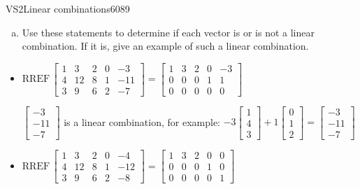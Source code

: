 \begin{exercise}{VS2}{Linear combinations}{6089}
\begin{exerciseStatement}
\begin{enumerate}[(a)]
\begin{itemize}
 
\end{itemize}

     
\item  

 Use these statements to determine if each vector is or is not a linear combination. If it is, give an example of such a linear combination. 

 
\end{enumerate}

     \end{exerciseStatement}
 \begin{exerciseAnswer} 

\begin{itemize}
\item  

 \(
\mathrm{RREF}\, \left[\begin{array}{cccc|c}
1 & 3 & 2 & 0 & -3 \\
4 & 12 & 8 & 1 & -11 \\
3 & 9 & 6 & 2 & -7
\end{array}\right] = \left[\begin{array}{cccc|c}
1 & 3 & 2 & 0 & -3 \\
0 & 0 & 0 & 1 & 1 \\
0 & 0 & 0 & 0 & 0
\end{array}\right]
                        \) 

 

 \(\left[\begin{array}{c}
-3 \\
-11 \\
-7
\end{array}\right]\) is a linear combination, for example: \(
-3 \left[\begin{array}{c}
1 \\
4 \\
3
\end{array}\right] + 1 \left[\begin{array}{c}
0 \\
1 \\
2
\end{array}\right] = \left[\begin{array}{c}
-3 \\
-11 \\
-7
\end{array}\right]
                            \) 

 
\item  

 \(
\mathrm{RREF}\, \left[\begin{array}{cccc|c}
1 & 3 & 2 & 0 & -4 \\
4 & 12 & 8 & 1 & -12 \\
3 & 9 & 6 & 2 & -8
\end{array}\right] = \left[\begin{array}{cccc|c}
1 & 3 & 2 & 0 & 0 \\
0 & 0 & 0 & 1 & 0 \\
0 & 0 & 0 & 0 & 1
\end{array}\right]
                        \) 


\end{itemize}
\end{exerciseAnswer}
\end{exercise}
